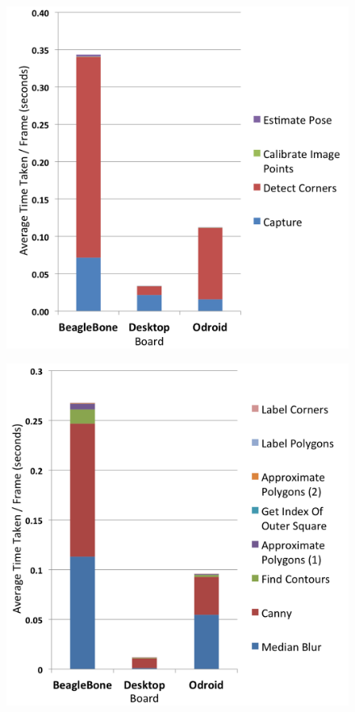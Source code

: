 \documentclass{acm_proc_article-sp}
\begin{document}
\begin{figure}[htbp]
\centering
\includegraphics[height=0.43\textheight]{images/performance/naive-breakdown-overall.png}
\label{fig:naive-breakdown-overall}
\end{figure}

\begin{figure}[htbp]
\centering
\includegraphics[height=0.43\textheight]{images/performance/naive-breakdown-detect-corners.png}
\label{fig:naive-breakdown-detect-corners}
\end{figure}
\end{document}
